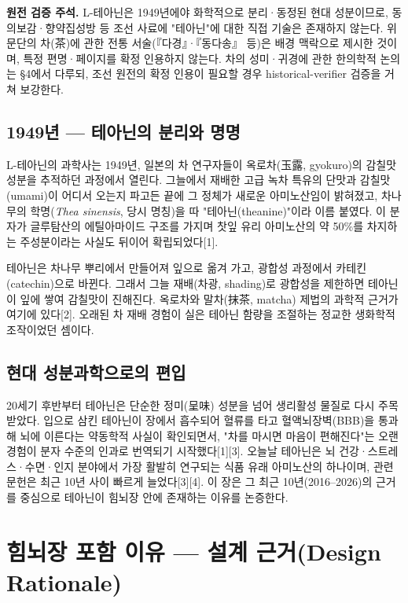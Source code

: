 \documentclass[12pt,oneside]{book}
\newenvironment{authnote}
  {\par\smallskip\begingroup\leftskip=6mm\rightskip=3mm\small\color{muted}\noindent\ignorespaces}
  {\par\endgroup\smallskip}
\begin{document}
\begin{authnote}\textbf{원전 검증 주석.} L-테아닌은 1949년에야 화학적으로 분리·동정된 현대 성분이므로, 동의보감·향약집성방 등 조선 사료에 "테아닌"에 대한 직접 기술은 존재하지 않는다. 위 문단의 차(茶)에 관한 전통 서술(『다경』·『동다송』 등)은 배경 맥락으로 제시한 것이며, 특정 편명·페이지를 확정 인용하지 않는다. 차의 성미·귀경에 관한 한의학적 논의는 §4에서 다루되, 조선 원전의 확정 인용이 필요할 경우 historical-verifier 검증을 거쳐 보강한다.\end{authnote}

\subsection{1949년 — 테아닌의 분리와 명명}

L-테아닌의 과학사는 1949년, 일본의 차 연구자들이 옥로차(玉露, gyokuro)의 감칠맛 성분을 추적하던 과정에서 열린다. 그늘에서 재배한 고급 녹차 특유의 단맛과 감칠맛(umami)이 어디서 오는지 파고든 끝에 그 정체가 새로운 아미노산임이 밝혀졌고, 차나무의 학명(\textit{Thea sinensis}, 당시 명칭)을 따 "테아닌(theanine)"이라 이름 붙였다. 이 분자가 글루탐산의 에틸아마이드 구조를 가지며 찻잎 유리 아미노산의 약 50\%를 차지하는 주성분이라는 사실도 뒤이어 확립되었다[1].

테아닌은 차나무 뿌리에서 만들어져 잎으로 옮겨 가고, 광합성 과정에서 카테킨(catechin)으로 바뀐다. 그래서 그늘 재배(차광, shading)로 광합성을 제한하면 테아닌이 잎에 쌓여 감칠맛이 진해진다. 옥로차와 말차(抹茶, matcha) 제법의 과학적 근거가 여기에 있다[2]. 오래된 차 재배 경험이 실은 테아닌 함량을 조절하는 정교한 생화학적 조작이었던 셈이다.

\subsection{현대 성분과학으로의 편입}

20세기 후반부터 테아닌은 단순한 정미(呈味) 성분을 넘어 생리활성 물질로 다시 주목받았다. 입으로 삼킨 테아닌이 장에서 흡수되어 혈류를 타고 혈액뇌장벽(BBB)을 통과해 뇌에 이른다는 약동학적 사실이 확인되면서, "차를 마시면 마음이 편해진다"는 오랜 경험이 분자 수준의 인과로 번역되기 시작했다[1][3]. 오늘날 테아닌은 뇌 건강·스트레스·수면·인지 분야에서 가장 활발히 연구되는 식품 유래 아미노산의 하나이며, 관련 문헌은 최근 10년 사이 빠르게 늘었다[3][4]. 이 장은 그 최근 10년(2016–2026)의 근거를 중심으로 테아닌이 힘뇌장 안에 존재하는 이유를 논증한다.

\section{힘뇌장 포함 이유 — 설계 근거(Design Rationale)}
\end{document}
